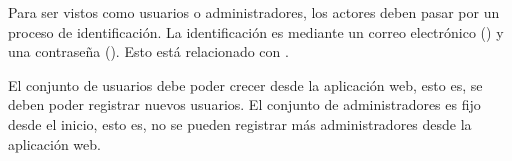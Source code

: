 {
  Para ser vistos como usuarios o administradores, los actores deben
  pasar por un proceso de identificación. La identificación es mediante
  un correo electrónico () y una
  contraseña (). Esto está relacionado
  con .
}

{
  El conjunto de usuarios debe poder crecer desde la aplicación web, esto es,
  se deben poder registrar nuevos usuarios. El conjunto de administradores es
  fijo desde el inicio, esto es, no se pueden registrar más administradores
  desde la aplicación web.
}
